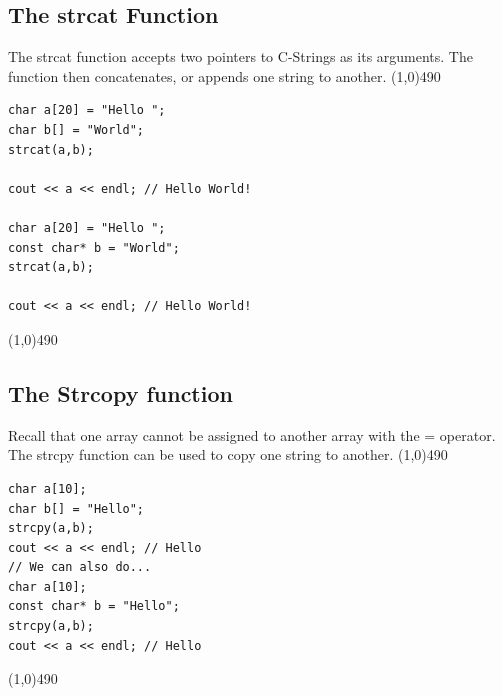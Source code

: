\documentclass{report}
\begin{document}
    \pagebreak \bigbreak \noindent 
    \subsection{The strcat Function}
    \bigbreak \noindent 
    The strcat function accepts two pointers to C-Strings as its arguments. The function then concatenates, or appends one string to another.
    \bigbreak \noindent 
    \line(1,0){490}
    \begin{verbatim}
char a[20] = "Hello ";
char b[] = "World";
strcat(a,b);

cout << a << endl; // Hello World!

char a[20] = "Hello ";
const char* b = "World";
strcat(a,b);

cout << a << endl; // Hello World!
    \end{verbatim}
    \line(1,0){490}
    \bigbreak \noindent 

    \bigbreak \noindent 
    \subsection{The Strcopy function}
    \bigbreak \noindent 
    Recall that one array cannot be assigned to another array with the = operator. The strcpy function can be used to copy one string to another.
    \bigbreak \noindent 
    \line(1,0){490}
    \begin{verbatim}
char a[10];
char b[] = "Hello";
strcpy(a,b);
cout << a << endl; // Hello
// We can also do...
char a[10];
const char* b = "Hello";
strcpy(a,b);
cout << a << endl; // Hello
    \end{verbatim}
    \line(1,0){490}
    \bigbreak \noindent 
    \bigbreak \noindent 

    \pagebreak \bigbreak \noindent 
\end{document}
